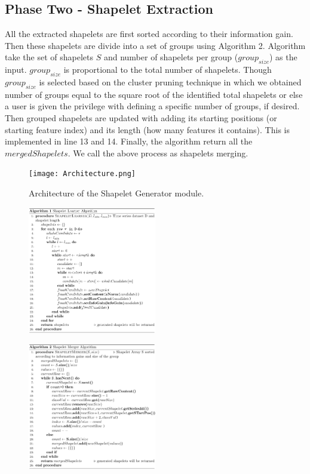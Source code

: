 \documentclass[conference]{IEEEtran}  %
\begin{document}
\subsection{Phase Two - Shapelet Extraction}
All the extracted shapelets are first sorted according to their information gain. Then these shapelets are divide into a set of groups using Algorithm 2. Algorithm take the set of shapelets $S$ and number of shapelets per group ($group_{size}$) as the input. $group_{size}$ is proportional to the total number of shapelets. Though $group_{size}$ is selected based on the cluster pruning technique in which we obtained number of groups equal to the square root of the identified total shapelets or else a user is given the privilege with defining a specific number of groups, if desired. Then grouped shapelets are updated with adding its starting positions (or starting feature index) and its length (how many features it contains). This is implemented in line 13 and 14. Finally, the algorithm return all the $mergedShapelets$. We call the above process as shapelets merging.

\begin{figure}
\texttt{[image: Architecture.png]}
\caption{Architecture of the Shapelet Generator module.}
\label{fig:hintgen}
\end{figure}

\begin{figure}
\includegraphics[width=0.5\textwidth]{algo1.png}
\end{figure}
\begin{figure}
\includegraphics[width=0.5\textwidth]{algo2.png}
\end{figure}
\end{document}
